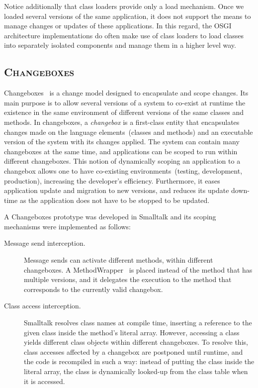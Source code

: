 Notice additionally that class loaders provide only a load mechanism. Once we loaded several versions of the same application, it does not support the means to manage changes or updates of these applications. In this regard, the OSGI~\cite{OSGI} architecture implementations do often make use of class loaders to load classes into separately isolated components and manage them in a higher level way.

\subsection*{\textsc{Changeboxes}}

Changeboxes~\cite{Denk07c} is a change model designed to encapsulate and scope changes. Its main purpose is to allow several versions of a system to co-exist at runtime \ie the existence in the same environment of different versions of the same classes and methods. In changeboxes, a \emph{changebox} is a first-class entity that encapsulates changes made on the language elements~(\eg classes and methods) and an executable version of the system with its changes applied. The system can contain many changeboxes at the same time, and applications can be scoped to run within different changeboxes. This notion of dynamically scoping an application to a changebox allows one to have co-existing environments~(\eg testing, development, production), increasing the developer's efficiency. Furthermore, it eases application update and migration to new versions, and reduces its update down-time as the application does not have to be stopped to be updated.

A Changeboxes prototype was developed in Smalltalk and its scoping mechanisms were implemented as follows:

\begin{description}
\item[Message send interception.] Message sends can activate different methods, within different changeboxes. A MethodWrapper~\cite{Bran98a} is placed instead of the method that has multiple versions, and it delegates the execution to the method that corresponds to the currently valid changebox.

\item[Class access interception.] Smalltalk resolves class names at compile time, inserting a reference to the given class inside the method's literal array. However, accessing a class yields different class objects within different changeboxes. To resolve this, class accesses affected by a changebox are postponed until runtime, and the code is recompiled in such a way: instead of putting the class inside the literal array, the class is dynamically looked-up from the class table when it is accessed.
\end{description}

